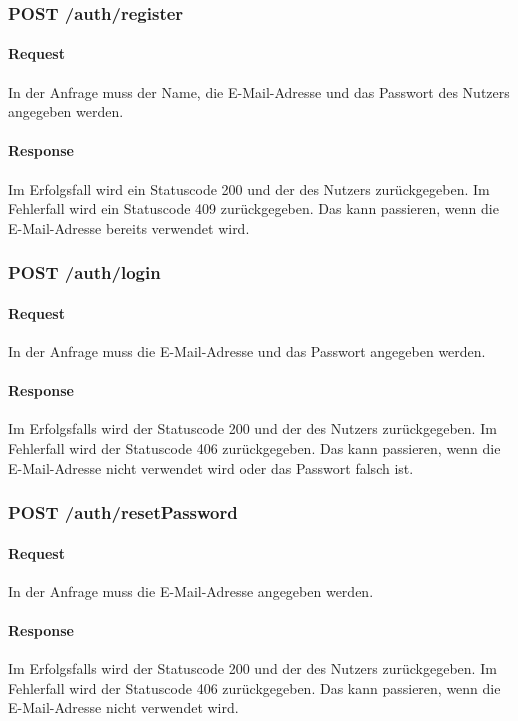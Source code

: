\documentclass{entwurfsheft}
\begin{document}
\begin{sloppypar}
\subsubsection*{POST /auth/register}
\paragraph{Request}
In der Anfrage muss der Name, die E-Mail-Adresse und das Passwort des Nutzers angegeben werden.

\paragraph{Response}
Im Erfolgsfall wird ein Statuscode 200 und der  des Nutzers zurückgegeben.
Im Fehlerfall wird ein Statuscode 409 zurückgegeben. Das kann passieren, wenn die E-Mail-Adresse bereits verwendet wird.

\subsubsection*{POST /auth/login}
    \paragraph{Request}
        In der Anfrage muss die E-Mail-Adresse und das Passwort angegeben werden.
    \paragraph{Response}
        Im Erfolgsfalls wird der Statuscode 200 und der  des Nutzers zurückgegeben.
        Im Fehlerfall wird der Statuscode 406 zurückgegeben. Das kann passieren, wenn die E-Mail-Adresse nicht verwendet wird oder das Passwort falsch ist.

\subsubsection*{POST /auth/resetPassword}
    \paragraph{Request}
        In der Anfrage muss die E-Mail-Adresse angegeben werden.
    \paragraph{Response}
        Im Erfolgsfalls wird der Statuscode 200 und der  des Nutzers zurückgegeben. 
        Im Fehlerfall wird der Statuscode 406 zurückgegeben. Das kann passieren, wenn die E-Mail-Adresse nicht verwendet wird.


\end{sloppypar}
\end{document}
